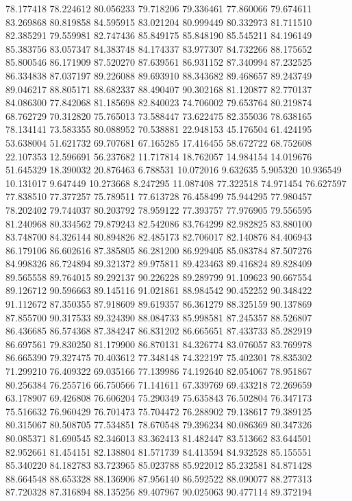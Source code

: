 78.177418
78.224612
80.056233
79.718206
79.336461
77.860066
79.674611
83.269868
80.819858
84.595915
83.021204
80.999449
80.332973
81.711510
82.385291
79.559981
82.747436
85.849175
85.848190
85.545211
84.196149
85.383756
83.057347
84.383748
84.174337
83.977307
84.732266
88.175652
85.800546
86.171909
87.520270
87.639561
86.931152
87.340994
87.232525
86.334838
87.037197
89.226088
89.693910
88.343682
89.468657
89.243749
89.046217
88.805171
88.682337
88.490407
90.302168
81.120877
82.770137
84.086300
77.842068
81.185698
82.840023
74.706002
79.653764
80.219874
68.762729
70.312820
75.765013
73.588447
73.622475
82.355036
78.638165
78.134141
73.583355
80.088952
70.538881
22.948153
45.176504
61.424195
53.638004
51.621732
69.707681
67.165285
17.416455
58.672722
68.752608
22.107353
12.596691
56.237682
11.717814
18.762057
14.984154
14.019676
51.645329
18.390032
20.876463
6.788531
10.072016
9.632635
5.905320
10.936549
10.131017
9.647449
10.273668
8.247295
11.087408
77.322518
74.971454
76.627597
77.838510
77.377257
75.789511
77.613728
76.458499
75.944295
77.980457
78.202402
79.744037
80.203792
78.959122
77.393757
77.976905
79.556595
81.240968
80.334562
79.879243
82.542086
83.764299
82.982825
83.880100
83.748700
84.326144
80.894826
82.485173
82.706017
82.140876
84.406943
86.179106
86.602616
87.385805
86.281200
86.929405
85.083784
87.507276
84.998326
86.724894
89.321372
89.975811
89.423463
89.416824
89.828409
89.565558
89.764015
89.292137
90.226228
89.289799
91.109623
90.667554
89.126712
90.596663
89.145116
91.021861
88.984542
90.452252
90.348422
91.112672
87.350355
87.918609
89.619357
86.361279
88.325159
90.137869
87.855700
90.317533
89.324390
88.084733
85.998581
87.245357
88.526807
86.436685
86.574368
87.384247
86.831202
86.665651
87.433733
85.282919
86.697561
79.830250
81.179900
86.870131
84.326774
83.076057
83.769978
86.665390
79.327475
70.403612
77.348148
74.322197
75.402301
78.835302
71.299210
76.409322
69.035166
77.139986
74.192640
82.054067
78.951867
80.256384
76.255716
66.750566
71.141611
67.339769
69.433218
72.269659
63.178907
69.426808
76.606204
75.290349
75.635843
76.502804
76.347173
75.516632
76.960429
76.701473
75.704472
76.288902
79.138617
79.389125
80.315067
80.508705
77.534851
78.670548
79.396234
80.086369
80.347326
80.085371
81.690545
82.346013
83.362413
81.482447
83.513662
83.644501
82.952661
81.454151
82.138804
81.571739
84.413594
84.932528
85.155551
85.340220
84.182783
83.723965
85.023788
85.922012
85.232581
84.871428
88.664548
88.653328
88.136906
87.956140
86.592522
88.090077
88.277313
87.720328
87.316894
88.135256
89.407967
90.025063
90.477114
89.372194
